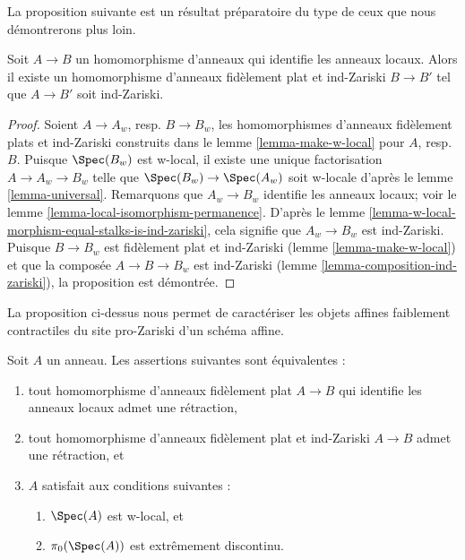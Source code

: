 \noindent
La proposition suivante est un résultat préparatoire du type de ceux
que nous démontrerons plus loin.

\begin{proposition}
\label{proposition-maps-wich-identify-local-rings}
Soit $A \to B$ un homomorphisme d'anneaux qui identifie les anneaux locaux.
Alors il existe un homomorphisme d'anneaux fidèlement plat et ind-Zariski
$B \to B'$ tel que $A \to B'$ soit ind-Zariski.
\end{proposition}

\begin{proof}
Soient $A \to A_w$, resp. $B \to B_w$, les homomorphismes d'anneaux fidèlement plats et ind-Zariski
construits dans le lemme \ref{lemma-make-w-local} pour $A$, resp.\ $B$.
Puisque $\Spec(B_w)$ est w-local, il existe une unique factorisation
$A \to A_w \to B_w$ telle que $\Spec(B_w) \to \Spec(A_w)$ soit w-locale
d'après le lemme \ref{lemma-universal}. Remarquons que $A_w \to B_w$ identifie
les anneaux locaux; voir
le lemme \ref{lemma-local-isomorphism-permanence}.
D'après le lemme \ref{lemma-w-local-morphism-equal-stalks-is-ind-zariski},
cela signifie que $A_w \to B_w$ est ind-Zariski. Puisque $B \to B_w$ est
fidèlement plat et ind-Zariski (lemme \ref{lemma-make-w-local})
et que la composée $A \to B \to B_w$ est ind-Zariski
(lemme \ref{lemma-composition-ind-zariski}),
la proposition est démontrée.
\end{proof}

\noindent
La proposition ci-dessus nous permet de caractériser les objets affines
faiblement contractiles du site pro-Zariski d'un schéma affine.

\begin{lemma}
\label{lemma-w-local-extremally-disconnected}
Soit $A$ un anneau. Les assertions suivantes sont équivalentes :
\begin{enumerate}
\item tout homomorphisme d'anneaux fidèlement plat $A \to B$ qui identifie les anneaux locaux
admet une rétraction,
\item tout homomorphisme d'anneaux fidèlement plat et ind-Zariski $A \to B$ admet une rétraction, et
\item $A$ satisfait aux conditions suivantes :
\begin{enumerate}
\item $\Spec(A)$ est w-local, et
\item $\pi_0(\Spec(A))$ est extrêmement discontinu.
\end{enumerate}
\end{enumerate}
\end{lemma}

